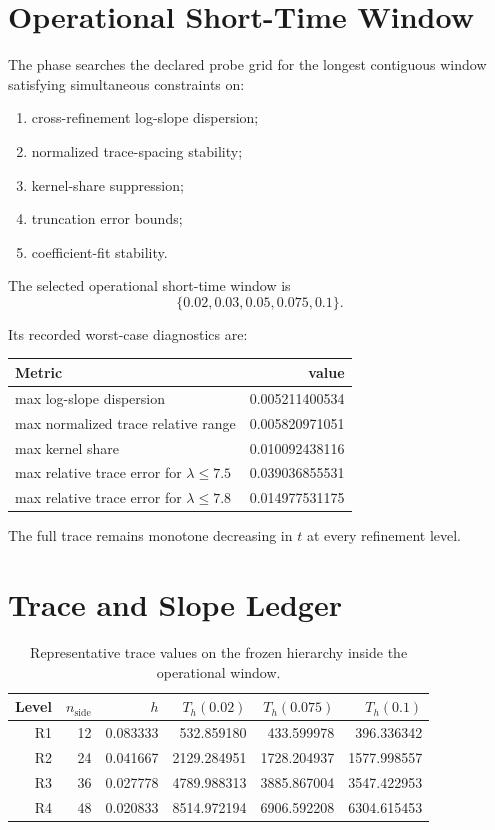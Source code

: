 \documentclass[11pt]{article}
\begin{document}
\section{Operational Short-Time Window}

The phase searches the declared probe grid for the longest contiguous window satisfying simultaneous constraints on:
\begin{enumerate}
\item cross-refinement log-slope dispersion;
\item normalized trace-spacing stability;
\item kernel-share suppression;
\item truncation error bounds;
\item coefficient-fit stability.
\end{enumerate}

The selected operational short-time window is
\[
\{0.02, 0.03, 0.05, 0.075, 0.1\}.
\]

Its recorded worst-case diagnostics are:
\begin{center}
\begin{tabular}{@{}lr@{}}
\toprule
Metric & value \\
\midrule
max log-slope dispersion & 0.005211400534 \\
max normalized trace relative range & 0.005820971051 \\
max kernel share & 0.010092438116 \\
max relative trace error for $\lambda \le 7.5$ & 0.039036855531 \\
max relative trace error for $\lambda \le 7.8$ & 0.014977531175 \\
\bottomrule
\end{tabular}
\end{center}

The full trace remains monotone decreasing in $t$ at every refinement level.

\section{Trace and Slope Ledger}

\begin{table}[t]
\centering
\small
\begin{tabular}{@{}rrrrrr@{}}
\toprule
Level & $n_{\mathrm{side}}$ & $h$ & $T_h(0.02)$ & $T_h(0.075)$ & $T_h(0.1)$ \\
\midrule
R1 & 12 & 0.083333 & 532.859180 & 433.599978 & 396.336342 \\
R2 & 24 & 0.041667 & 2129.284951 & 1728.204937 & 1577.998557 \\
R3 & 36 & 0.027778 & 4789.988313 & 3885.867004 & 3547.422953 \\
R4 & 48 & 0.020833 & 8514.972194 & 6906.592208 & 6304.615453 \\
\bottomrule
\end{tabular}
\caption{Representative trace values on the frozen hierarchy inside the operational window.}
\label{tab:trace}
\end{table}
\end{document}
